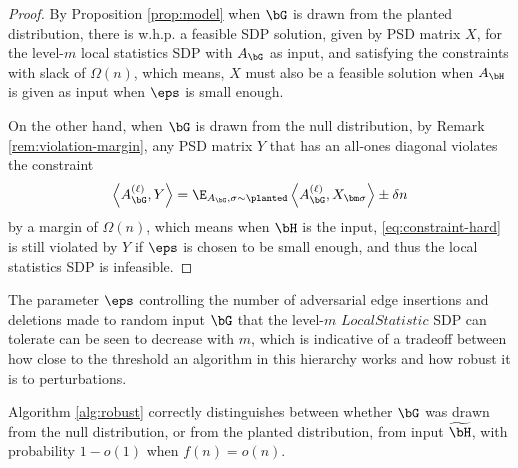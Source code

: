 \begin{proof}
	By Proposition \ref{prop:model} when $\bG$ is drawn from the planted distribution, there is w.h.p. a feasible SDP solution, given by PSD matrix $X$, for the level-$m$ local statistics SDP with $A_{\bG}$ as input, and satisfying the constraints with slack of $\Omega(n)$, which means, $X$ must also be a feasible solution when $A_{\bH}$ is given as input when $\eps$ is small enough.

	On the other hand, when $\bG$ is drawn from the null distribution, by Remark \ref{rem:violation-margin}, any PSD matrix $Y$ that has an all-ones diagonal violates the constraint
	\begin{align}	\label{eq:constraint-hard}
		\left\langle A_{\bG}^{(\ell)}, Y\right\rangle 
		= \E_{A_{\bG},\sigma \sim\planted}\left\langle A_{\bG}^{(\ell)}, X_{\bm \sigma}\right\rangle \pm \delta n
	\end{align}
	by a margin of $\Omega(n)$, which means when $\bH$ is the input, \eqref{eq:constraint-hard} is still violated by $Y$ if $\eps$ is chosen to be small enough, and thus the local statistics SDP is infeasible.
\end{proof}


\begin{remark}
    The parameter $\eps$ controlling the number of adversarial edge insertions and deletions made to random input $\bG$ that the level-$m$ $LocalStatistic$ SDP can tolerate can be seen to decrease with $m$, which is indicative of a tradeoff between how close to the threshold an algorithm in this hierarchy works and how robust it is to perturbations.
\end{remark}

\begin{corollary}
	Algorithm \ref{alg:robust} correctly distinguishes between whether $\bG$ was drawn from the null distribution, or from the planted distribution, from input $\widetilde{\bH}$, with probability $1-o(1)$ when $f(n) = o(n)$.
\end{corollary}